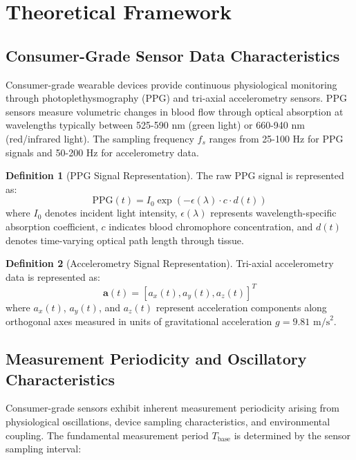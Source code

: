 \documentclass[12pt,a4paper]{article}
\theoremstyle{definition}
\newtheorem{definition}{Definition}[section]
\begin{document}
\section{Theoretical Framework}

\subsection{Consumer-Grade Sensor Data Characteristics}

Consumer-grade wearable devices provide continuous physiological monitoring through photoplethysmography (PPG) and tri-axial accelerometry sensors. PPG sensors measure volumetric changes in blood flow through optical absorption at wavelengths typically between 525-590 nm (green light) or 660-940 nm (red/infrared light). The sampling frequency $f_s$ ranges from 25-100 Hz for PPG signals and 50-200 Hz for accelerometry data.

\begin{definition}[PPG Signal Representation]
The raw PPG signal is represented as:
\begin{equation}
\text{PPG}(t) = I_0 \exp(-\epsilon(\lambda) \cdot c \cdot d(t))
\end{equation}
where $I_0$ denotes incident light intensity, $\epsilon(\lambda)$ represents wavelength-specific absorption coefficient, $c$ indicates blood chromophore concentration, and $d(t)$ denotes time-varying optical path length through tissue.
\end{definition}

\begin{definition}[Accelerometry Signal Representation]
Tri-axial accelerometry data is represented as:
\begin{equation}
\mathbf{a}(t) = [a_x(t), a_y(t), a_z(t)]^T
\end{equation}
where $a_x(t)$, $a_y(t)$, and $a_z(t)$ represent acceleration components along orthogonal axes measured in units of gravitational acceleration $g = 9.81 \text{ m/s}^2$.
\end{definition}

\subsection{Measurement Periodicity and Oscillatory Characteristics}

Consumer-grade sensors exhibit inherent measurement periodicity arising from physiological oscillations, device sampling characteristics, and environmental coupling. The fundamental measurement period $T_{\text{base}}$ is determined by the sensor sampling interval:
\end{document}
